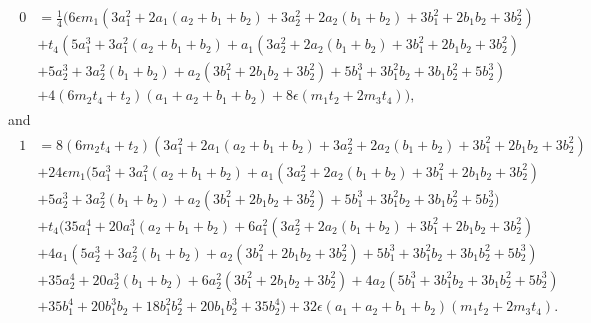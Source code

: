 \documentclass[10pt]{article}
\theoremstyle{plain}
\theoremstyle{definition}
\theoremstyle{plain}
\begin{document}
\begin{align*}
 \begin{split}
 0&=\frac{1}{4} \big(6 \epsilon m_{1} \left(3 a_{1}^2+2 a_{1}
 (a_{2}+b_{1}+b_{2})+3 a_{2}^2+2 a_{2} (b_{1}+b_{2})+3 b_{1}^2+2
 b_{1} b_{2}+3 b_{2}^2\right)\\
 &+t_{4} \left(5 a_{1}^3+3 a_{1}^2
 (a_{2}+b_{1}+b_{2})+a_{1} \left(3 a_{2}^2+2 a_{2} (b_{1}+b_{2})+3
 b_{1}^2+2 b_{1} b_{2}+3 b_{2}^2\right)\right.\\
 &\left.+5 a_{2}^3+3 a_{2}^2
 (b_{1}+b_{2})+a_{2} \left(3 b_{1}^2+2 b_{1} b_{2}+3 b_{2}^2\right)+5
 b_{1}^3+3 b_{1}^2 b_{2}+3 b_{1} b_{2}^2+5 b_{2}^3\right)\\
 &+4 (6 m_{2}
 t_{4}+t_{2}) (a_{1}+a_{2}+b_{1}+b_{2})+8 \epsilon (m_{1} t_{2}+2
 m_{3} t_{4})\big),
 \end{split}
\end{align*}
and
\begin{align*}
 \begin{split}
 1&= 8 (6 m_{2} t_{4}+t_{2}) \left(3 a_{1}^2+2 a_{1} (a_{2}+b_{1}+b_{2})+3
 a_{2}^2+2 a_{2} (b_{1}+b_{2})+3 b_{1}^2+2 b_{1} b_{2}+3
 b_{2}^2\right)\\
 &+24 \epsilon m_{1} (5 a_{1}^3+3 a_{1}^2
 (a_{2}+b_{1}+b_{2})+a_{1} \left(3 a_{2}^2+2 a_{2} (b_{1}+b_{2})+3
 b_{1}^2+2 b_{1} b_{2}+3 b_{2}^2\right)\\
 &+5 a_{2}^3+3 a_{2}^2
 (b_{1}+b_{2})+a_{2} \left(3 b_{1}^2+2 b_{1} b_{2}+3 b_{2}^2\right)+5
 b_{1}^3+3 b_{1}^2 b_{2}+3 b_{1} b_{2}^2+5 b_{2}^3)\\
 &+t_{4} \big(35
 a_{1}^4+20 a_{1}^3 (a_{2}+b_{1}+b_{2})+6 a_{1}^2 \left(3 a_{2}^2+2
 a_{2} (b_{1}+b_{2})+3 b_{1}^2+2 b_{1} b_{2}+3 b_{2}^2\right)\\
&+4 a_{1}
 \left(5 a_{2}^3+3 a_{2}^2 (b_{1}+b_{2})+a_{2} \left(3 b_{1}^2+2 b_{1}
 b_{2}+3 b_{2}^2\right)+5 b_{1}^3+3 b_{1}^2 b_{2}+3 b_{1} b_{2}^2+5
 b_{2}^3\right)\\
 &+35 a_{2}^4+20 a_{2}^3 (b_{1}+b_{2})+6 a_{2}^2 \left(3
 b_{1}^2+2 b_{1} b_{2}+3 b_{2}^2\right)+4 a_{2} \left(5 b_{1}^3+3 b_{1}^2
 b_{2}+3 b_{1} b_{2}^2+5 b_{2}^3\right)\\
 &+35 b_{1}^4+20 b_{1}^3 b_{2}+18
 b_{1}^2 b_{2}^2+20 b_{1} b_{2}^3+35 b_{2}^4\big)+32 \epsilon 
 (a_{1}+a_{2}+b_{1}+b_{2}) (m_{1} t_{2}+2 m_{3} t_{4}).
 \end{split}
\end{align*}
\end{document}
